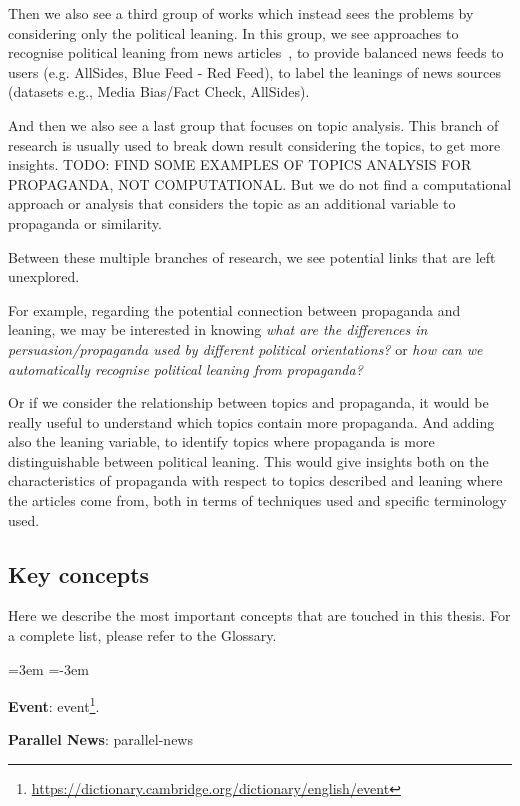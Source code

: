 Then we also see a third group of works which instead sees the problems by considering only the political leaning. In this group, we see approaches to recognise political leaning from news articles~\citep{baly2020we}, to provide balanced news feeds to users (e.g. AllSides, Blue Feed - Red Feed), to label the leanings of news sources (datasets e.g., Media Bias/Fact Check, AllSides).

And then we also see a last group that focuses on topic analysis. This branch of research is usually used to break down result considering the topics, to get more insights.
TODO: FIND SOME EXAMPLES OF TOPICS ANALYSIS FOR PROPAGANDA, NOT COMPUTATIONAL.
But we do not find a computational approach or analysis that considers the topic as an additional variable to propaganda or similarity.


Between these multiple branches of research, we see potential links that are left unexplored.

For example, regarding the potential connection between propaganda and leaning, we may be interested in knowing \emph{what are the differences in persuasion/propaganda used by different political orientations?} or \emph{how can we automatically recognise political leaning from propaganda?}

Or if we consider the relationship between topics and propaganda, it would be really useful to understand which topics contain more propaganda. And adding also the leaning variable, to identify topics where propaganda is more distinguishable between political leaning. This would give insights both on the characteristics of propaganda with respect to topics described and leaning where the articles come from, both in terms of techniques used and specific terminology used. 

\subsection{\statusorange Key concepts}

Here we describe the most important concepts that are touched in this thesis. For a complete list, please refer to the Glossary.

\leftskip=3em
\parindent=-3em

\textbf{Event}: \glsdesc*{event}\footnote{\url{https://dictionary.cambridge.org/dictionary/english/event}}.

\textbf{Parallel News}: \glsdesc*{parallel-news}

